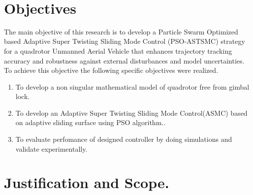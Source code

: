 \\
 



\section{Objectives}

The main objective of this research is to develop a Particle Swarm Optimized based Adaptive Super Twisting Sliding Mode Control (PSO-ASTSMC) strategy for a quadrotor Unmanned Aerial Vehicle  that enhances trajectory tracking accuracy and robustness against external disturbances and model uncertainties. To achieve this objective the following specific objectives were realized.


\begin{enumerate}[label= \roman*)]
\item 	 To develop a non singular  mathematical model of quadrotor free from gimbal lock.
\item 	To develop an Adaptive Super Twisting Sliding Mode Control(ASMC) based on adaptive sliding surface using PSO algorithm..
\item 	To evaluate perfomance of designed controller by doing simulations and validate experimentally.  

\end{enumerate}
			
\section{Justification and Scope.}


